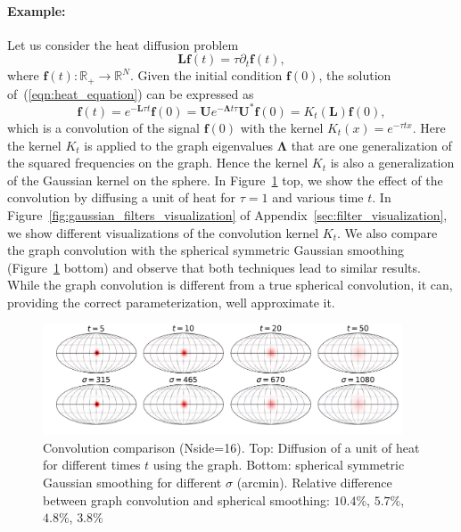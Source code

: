 \documentclass[final,twocolumn,3p,times,authoryear]{elsarticle}
\newcommand{\figref}[1]{Figure~\ref{fig:#1}}
\newcommand{\eqnref}[1]{(\ref{eqn:#1})}
\renewcommand{\b}[1]{{\bm{#1}}}   %
\newcommand{\1}{\b{1}}              %
\newcommand{\0}{\b{0}}              %
\newcommand{\g}[1]{\b{#1}}
\renewcommand{\L}{\b{L}} %
\newcommand{\U}{\b{U}}
\newcommand{\bLambda}{\b{\Lambda}}
\begin{document}
\paragraph{Example:}
Let us consider the heat diffusion problem
\begin{equation} \label{eqn:heat_equation}
\L \b{f}(t) = \tau \partial_t \b{f}(t),
\end{equation}
where $\b{f}(t): \mathbb{R}_+ \rightarrow \mathbb{R}^N$. Given the initial condition
$\b{f}(0)$, the solution of~\eqnref{heat_equation} can be expressed as
\begin{equation}
\b{f}(t) = e^{-\L \tau t} \b{f}(0) = \U e^{-\bLambda t \tau} \U^* \g{f}(0) = K_t(\L) \b{f}(0),
\end{equation}
which is a convolution of the signal $\b{f}(0)$ with the kernel $K_t(x)=e^{-\tau
t x}$. Here the kernel $K_t$ is applied to the graph eigenvalues $\bLambda$ that
are one generalization of the squared frequencies on the graph. Hence the kernel $K_t$ is also a generalization of the
Gaussian kernel on the sphere. In \figref{gaussian_filters_comparizon} top, we show
the effect of the convolution by diffusing a unit of heat for $\tau=1$ and various
time $t$. In \figref{gaussian_filters_visualization} of
Appendix~\ref{sec:filter_visualization}, we show different visualizations of the
convolution kernel $K_t$. We also compare the graph convolution with the
spherical symmetric Gaussian smoothing
(\figref{gaussian_filters_comparizon} bottom) and observe that both
techniques lead to similar results. While the graph convolution is different
from a true spherical convolution, it can, providing the correct
parameterization, well approximate it.

\begin{figure}[!ht]
\centering
\includegraphics[width=0.95\textwidth]{figures/gaussian_filters_sphere.pdf}
\caption{Convolution comparison (Nside=16).
Top: Diffusion of a unit of heat for different times $t$ using the graph.
Bottom: spherical symmetric Gaussian smoothing for different $\sigma$ (arcmin).
Relative difference between graph convolution and spherical smoothing: $10.4$\%, $5.7$\%, $4.8$\%, $3.8$\% }
\label{fig:gaussian_filters_comparizon}
\end{figure}
\end{document}
